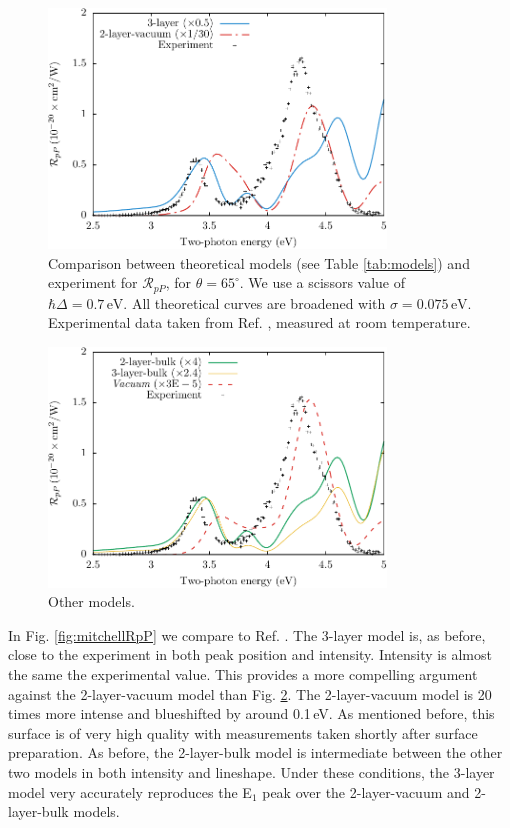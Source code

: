 \documentclass[11pt]{book}
\begin{document}
\begin{figure}
\centering 
\includegraphics[width=0.8\textwidth]{../figures/04-results/fig-4_4_05}
\caption{Comparison between theoretical models (see Table
\ref{tab:models}) and experiment for $\mathcal{R}_{pP}$, for
$\theta=65^{\circ}$. We use a scissors value of $\hbar\Delta = 0.7\,\text{eV}$.
All theoretical curves are broadened with $\sigma=0.075\,\text{eV}$.
Experimental data taken from Ref. \cite{mejiaPRB02}, measured at room
temperature. \label{fig:RpP}}
\end{figure}

\begin{figure}
\centering 
\includegraphics[width=0.8\textwidth]{../figures/04-results/fig-4_4_06}
\caption{Other models. \label{fig:RpP}}
\end{figure}

In Fig. \ref{fig:mitchellRpP} we compare to Ref. \cite{mitchellSS01}. The
3-layer model is, as before, close to the experiment in both peak position and
intensity. Intensity is almost the same the experimental value. This provides a
more compelling argument against the 2-layer-vacuum model than Fig.
\ref{fig:RpP}. The 2-layer-vacuum model is 20 times more intense and blueshifted
by around 0.1\,eV. As mentioned before, this surface is of very high quality
with measurements taken shortly after surface preparation. As before, the
2-layer-bulk model is intermediate between the other two models in both
intensity and lineshape. Under these conditions, the 3-layer model very
accurately reproduces the E$_{1}$ peak over the 2-layer-vacuum and 2-layer-bulk
models.
\end{document}

